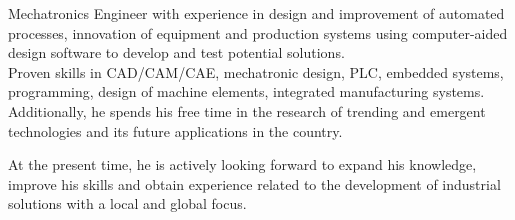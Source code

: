 \begin{bodyfont}

Mechatronics Engineer with experience in design and improvement of automated processes, innovation of equipment and production systems using computer-aided design software to develop and test potential solutions. 
\\
Proven skills in CAD/CAM/CAE, mechatronic design, PLC, embedded systems, programming, design of machine elements, integrated manufacturing systems. Additionally, he spends his free time in the research of trending and emergent technologies and its future applications in the country.

At the present time, he is actively looking forward to expand his knowledge, improve his skills and obtain experience related to the development of industrial solutions with a local and global focus.

\end{bodyfont}